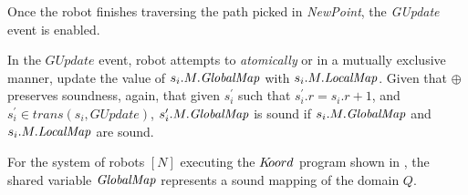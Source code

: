 Once the robot finishes traversing the path picked in \emph{NewPoint}, the \emph{GUpdate} event is enabled.


In the $GUpdate$ event, robot attempts to \emph{atomically} or in a mutually exclusive manner, update the value of $s_i.M.\mathit{GlobalMap}$ with  $s_i.M.\mathit{LocalMap}$. Given that $\oplus$ preserves soundness, again, that given $s_i^\prime$ such that $s_i^\prime.r = s_i.r + 1$, and $\mathit{s_i^\prime \in \mathit{trans}(s_i,\mathit{GUpdate})}$,  $s_i^\prime.M.\mathit{GlobalMap}$ is sound if $s_i.M.\mathit{GlobalMap}$ and $s_i.M.\mathit{LocalMap}$ are sound.

\begin{theorem}
    For the system of robots $[N]$ executing the $K\kern-2pt oord$ program shown in , the shared variable $\mathit{GlobalMap}$ represents a sound mapping of the domain $Q$.
\end{theorem}

